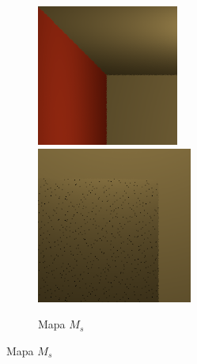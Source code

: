 \begin{figure}[h!]
{\begin{minipage}{\dimexpr .33\textwidth-\fboxsep-2\fboxrule}
\begin{subfigure}{\textwidth}
            \includegraphics[width=\textwidth]{imagenes/sphere61}
            \includegraphics[width=\textwidth]{imagenes/sphere62}
            \caption{Mapa $M_s$}
            \end{subfigure}%

\end{minipage}}
\end{figure}
